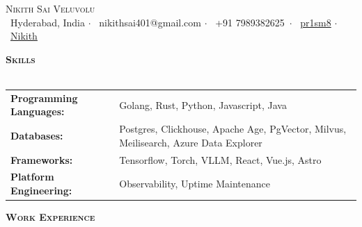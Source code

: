 \documentclass[a4paper]{article}
\newcommand{\lineunder} {
    \vspace*{-8pt} \\
    \hspace*{-18pt} \hrulefill \\
}
\newcommand{\header} [1] {
    {\hspace*{-18pt}\vspace*{6pt} \textbf{\textsc{#1}}}
    \vspace*{-6pt} \lineunder
}
\begin{document}
\vspace*{-40pt}



\vspace*{-10pt}
\begin{center}
	{\Huge \scshape {Nikith Sai Veluvolu}}\\
	\faMapMarker\ Hyderabad, India $\cdot$ \faAt\ nikithsai401@gmail.com $\cdot$ \faMobile\ +91 7989382625\ $\cdot$ \faGithub\ \href{https://github.com/pr1sm8}{pr1sm8} $\cdot$ \faLinkedinSquare\ \href{https://www.linkedin.com/in/nikith-sai-veluvolu/}{Nikith} \
\end{center}


\vspace{1mm}
\begin{minipage}{\linewidth}
\header{Skills}
\begin{tabularx}{\textwidth}{l X}
	\textbf{Programming Languages:}  & Golang, Rust, Python, Javascript, Java                                                \\
	\textbf{Databases:}              & Postgres, Clickhouse, Apache Age, PgVector, Milvus, Meilisearch, Azure Data Explorer  \\
	\textbf{Frameworks:}             & Tensorflow, Torch, VLLM, React, Vue.js, Astro                                         \\
	\textbf{Platform Engineering:}   & Observability, Uptime Maintenance                                                     \\
\end{tabularx}
\end{minipage}

\vspace{2mm}
\header{Work Experience}
\end{document}
